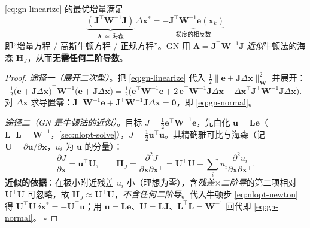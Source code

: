 \begin{theorem}[高斯牛顿增量方程]\label{thm:gn}
\cref{eq:gn-linearize} 的最优增量满足
\begin{equation}
  \boxed{\ \underbrace{(\mathbf{J}^\top\mathbf{W}^{-1}\mathbf{J})}_{\textstyle\boldsymbol{\Lambda}\ \approx\,\text{海森}}\,\Delta\mathbf{x}^*
  =\underbrace{-\mathbf{J}^\top\mathbf{W}^{-1}\mathbf{e}(\mathbf{x}_k)}_{\textstyle\text{梯度的相反数}}\ }
  \label{eq:gn-normal}
\end{equation}
即“增量方程 / 高斯牛顿方程 / 正规方程”。GN 用 $\boldsymbol{\Lambda}=\mathbf{J}^\top\mathbf{W}^{-1}\mathbf{J}$ \emph{近似}牛顿法的海森 $\mathbf{H}_J$，从而\textbf{无需任何二阶导数}。
\end{theorem}
\begin{proof}
\emph{途径一（展开二次型）}\cite{gaoxiang2019slam14}。把 \cref{eq:gn-linearize} 代入 $\tfrac12\|\mathbf{e}+\mathbf{J}\Delta\mathbf{x}\|_{\mathbf{W}}^2$ 并展开：
\[
  \tfrac12\big(\mathbf{e}+\mathbf{J}\Delta\mathbf{x}\big)^\top\mathbf{W}^{-1}\big(\mathbf{e}+\mathbf{J}\Delta\mathbf{x}\big)
  =\tfrac12\Big(\mathbf{e}^\top\mathbf{W}^{-1}\mathbf{e}+2\,\mathbf{e}^\top\mathbf{W}^{-1}\mathbf{J}\Delta\mathbf{x}+\Delta\mathbf{x}^\top\mathbf{J}^\top\mathbf{W}^{-1}\mathbf{J}\Delta\mathbf{x}\Big).
\]
对 $\Delta\mathbf{x}$ 求导置零：$\mathbf{J}^\top\mathbf{W}^{-1}\mathbf{e}+\mathbf{J}^\top\mathbf{W}^{-1}\mathbf{J}\Delta\mathbf{x}=\mathbf{0}$，即 \cref{eq:gn-normal}。

\emph{途径二（GN 是牛顿法的近似）}\cite{barfoot2024state}。目标 $J=\tfrac12\mathbf{e}^\top\mathbf{W}^{-1}\mathbf{e}$，先白化 $\mathbf{u}=\mathbf{L}\mathbf{e}$（$\mathbf{L}^\top\mathbf{L}=\mathbf{W}^{-1}$，\cref{sec:nlopt-solve}），$J=\tfrac12\mathbf{u}^\top\mathbf{u}$。其精确雅可比与海森（记 $\mathbf{U}=\partial\mathbf{u}/\partial\mathbf{x}$，$u_i$ 为 $\mathbf{u}$ 的分量）：
\[
  \frac{\partial J}{\partial\mathbf{x}}=\mathbf{u}^\top\mathbf{U},\qquad
  \mathbf{H}_J=\frac{\partial^2 J}{\partial\mathbf{x}\partial\mathbf{x}^\top}=\mathbf{U}^\top\mathbf{U}+\sum_{i}u_i\frac{\partial^2 u_i}{\partial\mathbf{x}\partial\mathbf{x}^\top}.
\]
\textbf{近似的依据}：在极小附近残差 $u_i$ 小（理想为零），含\emph{残差$\times$二阶导}的第二项相对 $\mathbf{U}^\top\mathbf{U}$ 可忽略，故 $\mathbf{H}_J\approx\mathbf{U}^\top\mathbf{U}$，\emph{不含任何二阶导}。代入牛顿步 \cref{eq:nlopt-newton} 得 $\mathbf{U}^\top\mathbf{U}\,\delta\mathbf{x}^*=-\mathbf{U}^\top\mathbf{u}$；用 $\mathbf{u}=\mathbf{L}\mathbf{e}$、$\mathbf{U}=\mathbf{L}\mathbf{J}$、$\mathbf{L}^\top\mathbf{L}=\mathbf{W}^{-1}$ 回代即 \cref{eq:gn-normal}。
\hfill$\square$
\end{proof}


